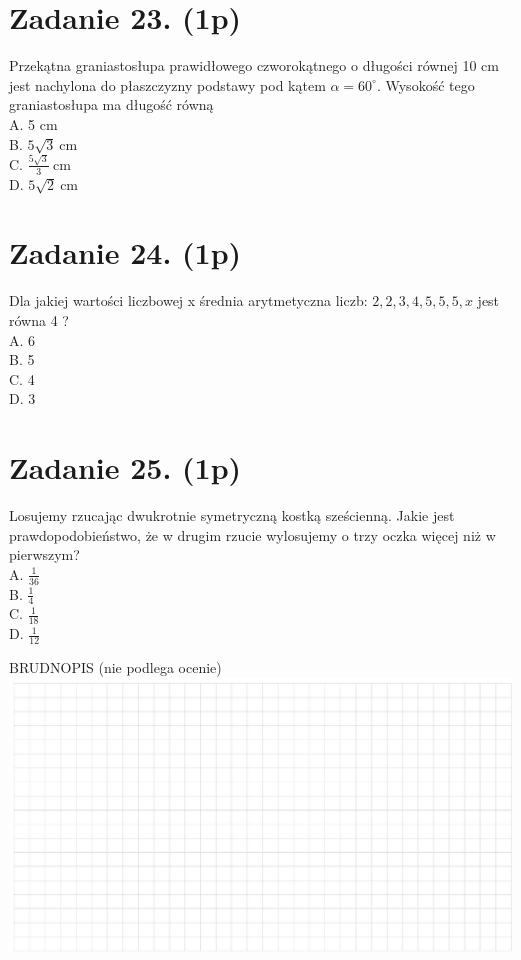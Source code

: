 \documentclass[10pt]{article}
\begin{document}
\section*{Zadanie 23. (1p)}
Przekątna graniastosłupa prawidłowego czworokątnego o długości równej 10 cm jest nachylona do płaszczyzny podstawy pod kątem \(\alpha=60^{\circ}\). Wysokość tego graniastosłupa ma długość równą\\
A. 5 cm\\
B. \(5 \sqrt{3} \mathrm{~cm}\)\\
C. \(\frac{5 \sqrt{3}}{3} \mathrm{~cm}\)\\
D. \(5 \sqrt{2} \mathrm{~cm}\)

\section*{Zadanie 24. (1p)}
Dla jakiej wartości liczbowej x średnia arytmetyczna liczb: \(2,2,3,4,5,5,5, x\) jest równa 4 ?\\
A. 6\\
B. 5\\
C. 4\\
D. 3

\section*{Zadanie 25. (1p)}
Losujemy rzucając dwukrotnie symetryczną kostką sześcienną. Jakie jest prawdopodobieństwo, że w drugim rzucie wylosujemy o trzy oczka więcej niż w pierwszym?\\
A. \(\frac{1}{36}\)\\
B. \(\frac{1}{4}\)\\
C. \(\frac{1}{18}\)\\
D. \(\frac{1}{12}\)

BRUDNOPIS (nie podlega ocenie)\\
\includegraphics[max width=\textwidth, center]{2024_11_21_2a465a6670163fcfd70dg-08}
\end{document}
